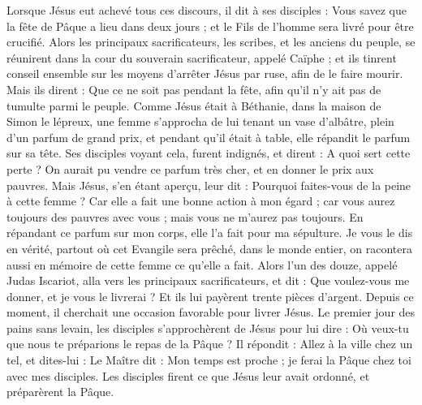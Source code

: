 \begin{multicols}{2}
\VerseOne{}Lorsque Jésus eut achevé tous ces discours, il dit à ses disciples :
Vous savez que la fête de Pâque a lieu dans deux jours ; et le Fils de l'homme sera livré pour être crucifié.
Alors les principaux sacrificateurs, les scribes, et les anciens du peuple, se réunirent dans la cour du souverain sacrificateur, appelé Caïphe ;
et ils tinrent conseil ensemble sur les moyens d’arrêter Jésus par ruse, afin de le faire mourir.
Mais ils dirent : Que ce ne soit pas pendant la fête, afin qu’il n’y ait pas de tumulte parmi le peuple.
Comme Jésus était à Béthanie, dans la maison de Simon le lépreux,
une femme s’approcha de lui tenant un vase d'albâtre, plein d'un parfum de grand prix, et pendant qu’il était à table, elle répandit le parfum sur sa tête.
Ses disciples voyant cela, furent indignés, et dirent : A quoi sert cette perte ?
On aurait pu vendre ce parfum très cher, et en donner le prix aux pauvres.
Mais Jésus, s’en étant aperçu, leur dit : Pourquoi faites-vous de la peine à cette femme ? Car elle a fait une bonne action à mon égard ;
car vous aurez toujours des pauvres avec vous ; mais vous ne m'aurez pas toujours.
En répandant ce parfum sur mon corps, elle l'a fait pour ma sépulture.
Je vous le dis en vérité, partout où cet Evangile sera prêché, dans le monde entier, on racontera aussi en mémoire de cette femme ce qu’elle a fait.
Alors l'un des douze, appelé Judas Iscariot, alla vers les principaux sacrificateurs,
et dit : Que voulez-vous me donner, et je vous le livrerai ? Et ils lui payèrent trente pièces d'argent{}.
Depuis ce moment, il cherchait une occasion favorable pour livrer Jésus.
Le premier jour des pains sans levain, les disciples s’approchèrent de Jésus pour lui dire : Où veux-tu que nous te préparions le repas de la Pâque ?
Il répondit : Allez à la ville chez un tel, et dites-lui : Le Maître dit : Mon temps est proche ; je ferai la Pâque chez toi avec mes disciples.
Les disciples firent ce que Jésus leur avait ordonné, et préparèrent la Pâque.

\end{multicols}
